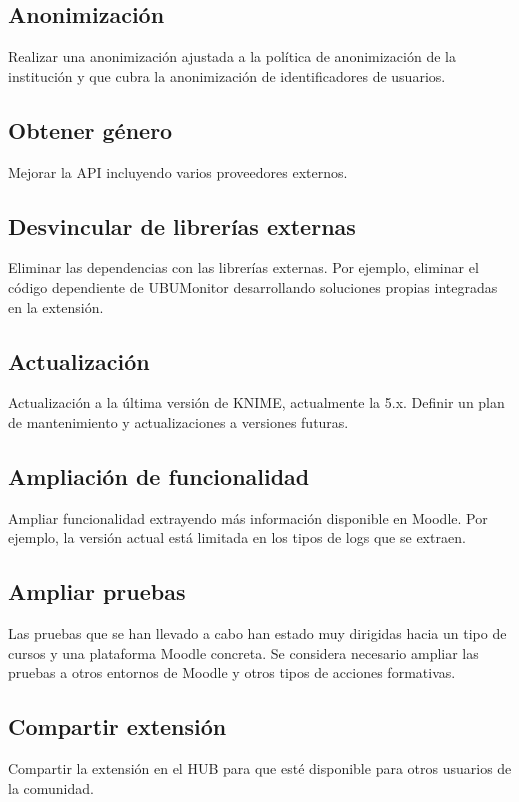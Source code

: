 \subsection{Anonimización}

Realizar una anonimización ajustada a la política de anonimización de la institución y que cubra la anonimización de identificadores de usuarios. 


\subsection{Obtener género}

Mejorar la API incluyendo varios proveedores externos. 


\subsection{Desvincular de librerías externas}

Eliminar las dependencias con las librerías externas. Por ejemplo, eliminar el código dependiente de UBUMonitor desarrollando soluciones propias integradas en la extensión. 

\subsection{Actualización}

Actualización a la última versión de KNIME, actualmente la 5.x. Definir un plan de mantenimiento y actualizaciones a versiones futuras. 


\subsection{Ampliación de funcionalidad}

Ampliar funcionalidad extrayendo más información disponible en Moodle. Por ejemplo, la versión actual está limitada en los tipos de logs que se extraen. 


\subsection{Ampliar pruebas}

Las pruebas que se han llevado a cabo han estado muy dirigidas hacia un tipo de cursos y una plataforma Moodle concreta. Se considera necesario 
ampliar las pruebas a otros entornos de Moodle y otros tipos de acciones formativas. 


\subsection{Compartir extensión}

Compartir la extensión en el  HUB para que esté disponible para otros usuarios de la comunidad. 


